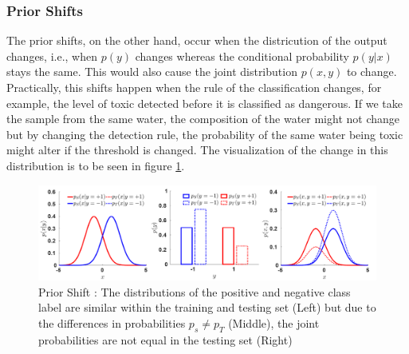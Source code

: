 \subsubsection*{Prior Shifts}
The prior shifts, on the other hand, occur when the districution of the output changes, i.e., when $p(y)$ changes whereas the conditional probability $p(y|x)$ stays the same. This would also cause the joint distribution $p(x, y)$ to change. Practically, this shifts happen when the rule of the classification changes, for example, the level of toxic detected before it is classified as dangerous. If we take the sample from the same water, the composition of the water might not change but by changing the detection rule, the probability of the same water being toxic might alter if the threshold is changed. The visualization of the change in this distribution is to be seen in figure \ref{fig:priorShiftPic}.
\begin{figure}[tbh]
  \centering
    \includegraphics[width=\linewidth]{abbildungen/priorShiftPic.png}
  \caption{Prior Shift \cite{dataShifts}: The distributions of the positive and negative class label are similar within the training and testing set (Left) but due to the differences in probabilities $p_s \neq p_T$ (Middle), the joint probabilities are not equal in the testing set (Right)}
  \label{fig:priorShiftPic}
\end{figure}

